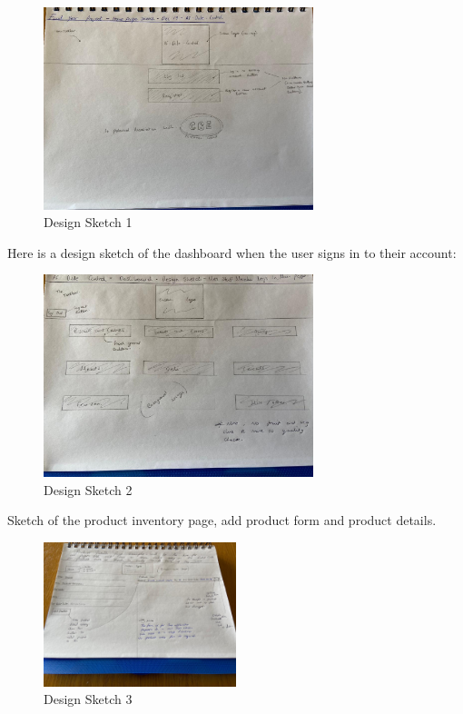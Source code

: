 \begin{figure}[h!]
	\caption{Design Sketch 1}
	\label{image:sketch1}
	\centering
	\includegraphics[width=0.7\textwidth]{images/sketch1.jpg}
\end{figure}

Here is a design sketch of the dashboard when the user signs in to their account:

\begin{figure}[h!]
	\caption{Design Sketch 2}
	\label{image:sketch2}
	\centering
	\includegraphics[width=0.7\textwidth]{images/sketch2.jpg}
\end{figure}
\newpage
Sketch of the product inventory page, add product form and product details.
\begin{figure}[h!]
	\caption{Design Sketch 3}
	\label{image:sketch3}
	\centering
	\includegraphics[width=0.5\textwidth]{images/sketch3.jpg}
\end{figure}

